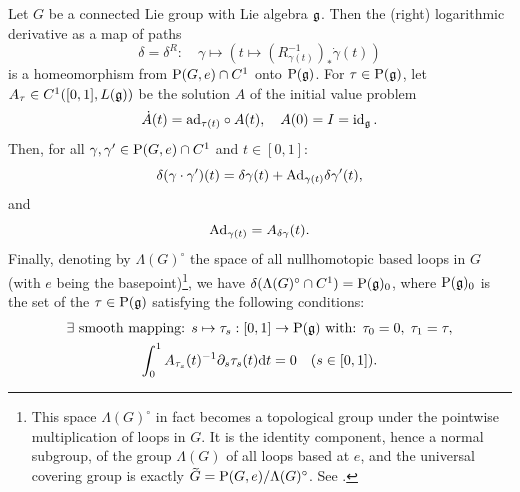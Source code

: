\begin{lem}[{{\cite[Prop.~1.13.4]{DK}}}]\label{lem invertibility of D}
    Let $G$ be a connected Lie group with Lie algebra $\mathfrak{g}$. Then the (right) logarithmic derivative as a map of paths
    \[\delta=\delta^R:\quad \gamma\mapsto \left(t\mapsto \left(R_{\gamma(t)}^{-1}\right)_\ast\dot\gamma(t)\right)\]
    is a homeomorphism from $\mathrm{P}(G,e)\cap C^1$ onto $\mathrm{P}(\mathfrak{g})$. For $\tau\in \mathrm{P}(\mathfrak{g})$, let $A_\tau\in C^1([0,1],\boldsymbol{\mathrm{\mathrm}}{L}(\mathfrak{g}))$
    be the solution $A$ of the initial value problem
    \[\dot A(t)=\mathrm{ad}_{\tau(t)}\circ A(t),\quad A(0)=I=\operatorname{id}_{\mathfrak{g}}.\label{1792}\]
    Then, for all $\gamma,\gamma'\in \mathrm{P}(G,e)\cap C^1$ and $t\in [0,1]$:
    \[\delta(\gamma\cdot \gamma')(t)=\delta\gamma(t)+\mathrm{Ad}_{\gamma(t)}\delta \gamma'(t),\label{1794}\]
    and 
    \[\mathrm{Ad}_{\gamma(t)}=A_{\delta \gamma}(t).\]
    Finally, denoting by $\Lambda(G)^\circ$ the space of all nullhomotopic based loops in $G$ (with $e$ being the basepoint)\footnote{This space $\Lambda(G)^\circ$ in fact becomes a topological group under the pointwise multiplication of loops in $G$. It is the identity component, hence a normal subgroup, of the group $\Lambda(G)$ of all loops based at $e$, and the universal covering group is exactly $\wt{G}=\rmP(G,e)\slash\Lambda(G)^\circ$. See \cite[Prop.~1.13.2]{DK}.}, we have $\delta(\Lambda(G)^\circ\cap C^1)=\mathrm{P}(\mathfrak{g})_0$,
    where $\mathrm{P}(\mathfrak{g})_0$ is the set of the $\tau\in\mathrm{P}(\mathfrak{g})$ satisfying the following conditions:
    \begin{gather}
        \exists \text{ smooth mapping: } s\mapsto \tau_s:[0,1]\to \mathrm{P}(\mathfrak{g})\text{ with: } \tau_0=0,\;\tau_1=\tau,\\
        \int_0^1 A_{\tau_s}(t)^{-1}\partial_s\tau_s(t){\mathrm{d}} t=0\quad (s\in [0,1]).
    \end{gather}
\end{lem}
